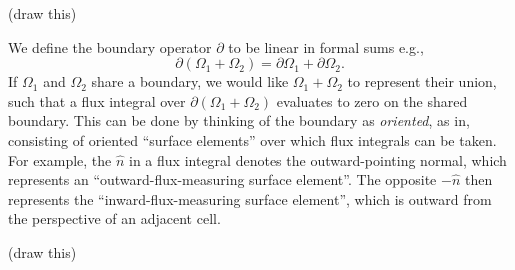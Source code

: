 \documentclass[11pt,a4paper]{memoir}
\newcommand{\om}{{\Omega}}
\newcommand{\pom}{{\partial\Omega}}
\begin{document}
\vskip 0.2in
(draw this)
\vskip 0.2in

We define the boundary operator $\partial$ to be linear in formal sums e.g.,
    $$\partial(\Omega_1 + \Omega_2) = \pom_1 + \pom_2.$$
If $\om_1$ and $\om_2$ share a boundary, we would like $\om_1 + \om_2$ to represent their union, such that a flux
integral over $\partial(\Omega_1 + \Omega_2)$ evaluates to zero on the shared boundary. This can be done by thinking of
the boundary as \textit{oriented}, as in, consisting of oriented ``surface elements'' over which flux integrals can be taken.
For example, the $\hat{n}$ in a flux integral denotes the outward-pointing normal, which represents an ``outward-flux-measuring surface element''.
The opposite $-\hat{n}$ then represents the ``inward-flux-measuring surface element'', which is outward from the perspective of an adjacent cell.

\vskip 0.2in
(draw this)
\vskip 0.2in
\end{document}
